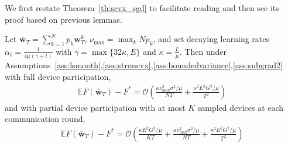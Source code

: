 We first restate Theorem~\ref{th:scvx_sgd} to facilitate reading and then see its proof based on previous lemmas.
\begin{thm}
	Let $\overline{\mathbf{w}}_{T}=\sum_{k=1}^{N}p_{k}\mathbf{w}_{T}^{k}$,
	$\nu_{\max}=\max_{k}Np_{k}$, and set decaying learning rates $\alpha_{t}=\frac{1}{4\mu(\gamma+t)}$
	with $\gamma=\max\{32\kappa,E\}$ and $\kappa=\frac{L}{\mu}$. Then
	under Assumptions~\ref{ass:lsmooth},\ref{ass:stroncvx},\ref{ass:boundedvariance},\ref{ass:subgrad2} with full device participation, 
	\begin{align*}
	\mathbb{E}F(\overline{\mathbf{w}}_{T})-F^{\ast}=\mathcal{O}\left(\frac{\kappa\nu_{\max}^{2}\sigma^{2}/\mu}{NT}+\frac{\kappa^{2}E^{2}G^{2}/\mu}{T^{2}}\right)
	\end{align*}
	and with partial device participation with at most $K$ sampled devices
	at each communication round, 
	\begin{align*}
	\mathbb{E}F(\overline{\mathbf{w}}_{T})-F^{\ast}=\mathcal{O}\left(\frac{\kappa E^{2}G^{2}/\mu}{KT}+\frac{\kappa\nu_{\max}^{2}\sigma^{2}/\mu}{NT}+\frac{\kappa^{2}E^{2}G^{2}/\mu}{T^{2}}\right)
	\end{align*}
\end{thm}

